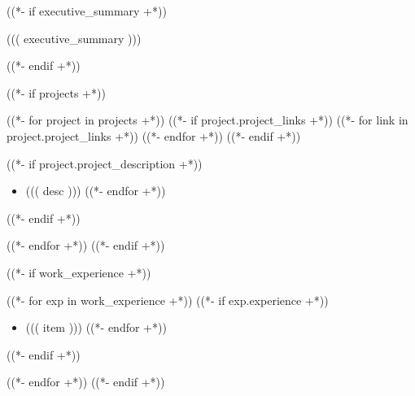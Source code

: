 \documentclass[10pt,a4paper,ragged2e,withhyper]{altacv}
\begin{document}


\makecvheader

((*- if executive_summary +*))
\begin{flushleft}
((( executive_summary )))
\end{flushleft}

((*- endif +*))

((*- if projects +*))

((*- for project in projects +*))
((*- if project.project_links +*))
((*- for link in project.project_links +*))
((*- endfor +*))
((*- endif +*))

((*- if project.project_description +*))
\begin{itemize}
((*- for desc in project.project_description +*))
    \item ((( desc )))
((*- endfor +*))
\end{itemize}
((*- endif +*))

((*- endfor +*))
((*- endif +*))

((*- if work_experience +*))

((*- for exp in work_experience +*))
((*- if exp.experience +*))
\begin{itemize}
((*- for item in exp.experience +*))
    \item ((( item )))
((*- endfor +*))
\end{itemize}
((*- endif +*))

((*- endfor +*))
((*- endif +*))

\renewcommand{\cvDateMarker}{}

\end{document}
